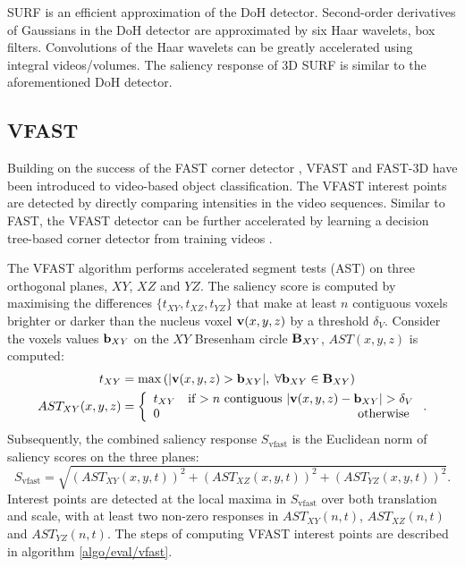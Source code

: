 SURF is an efficient approximation of the DoH detector. Second-order derivatives of Gaussians in the DoH detector are approximated by six Haar wavelets, \ie box filters. Convolutions of the Haar wavelets can be greatly accelerated using integral videos/volumes. The saliency response of 3D SURF is similar to the aforementioned DoH detector. 

\subsection{VFAST}
\label{sec/eval/vfast}

Building on the success of the FAST corner detector \cite{Rosten2010}, VFAST \cite{Yu2010} and FAST-3D \cite{Koelstra2009} have been introduced to video-based object classification. 
The VFAST interest points are detected by directly comparing intensities in the video sequences. Similar to FAST, the VFAST detector can be further accelerated by learning a decision tree-based corner detector from training videos \cite{Rosten2010}. 

The VFAST algorithm performs accelerated segment tests (AST) on three orthogonal planes, $XY$, $XZ$ and $YZ$. The saliency score is computed by maximising the differences $\{ t_{XY}, t_{XZ}, t_{YZ} \}$ that make at least $n$ contiguous voxels brighter or darker than the nucleus voxel $\mathbf{v}(x,y,z)$ by a threshold $\delta_{V}$. Consider the voxels values $\mathbf{b}_{XY}$ on the $XY$ Bresenham circle $\mathbf{B}_{XY}$, $AST(x,y,z)$ is computed:  
\begin{align}
	t_{XY} & = \max\left(| \mathbf{v}(x,y,z) > \mathbf{b}_{XY}|,\;\forall \mathbf{b}_{XY} \in \mathbf{B}_{XY} \right)\\ 
AST_{XY}(x,y,z) & = \left\{
\begin{array}{lr}
	t_{XY} & \mbox{if $> n$ contiguous } |\mathbf{v}(x,y,z) - \mathbf{b}_{XY}| > \delta_{V} \\
	0 & \mbox{ otherwise }
\end{array}
\right..
\label{eqn/eval/fastast}
\end{align}
Subsequently, the combined saliency response $S_{\textrm{vfast}}$ is the Euclidean norm of saliency scores on the three planes: 
\begin{equation}
S_\textrm{vfast} = \sqrt{ \left(AST_{XY}(x,y,t)\right)^2+ \left(AST_{XZ}(x,y,t)\right)^2+ \left(AST_{YZ}(x,y,t)\right)^2}.
\label{eqn/eval/fastverall}
\end{equation}
Interest points are detected at the local maxima in $S_{\textrm{vfast}}$ over both translation and scale, with at least two non-zero responses in $AST_{XY}(n,t)$, $AST_{XZ}(n,t)$ and $AST_{YZ}(n,t)$. The steps of computing VFAST interest points are described in algorithm \ref{algo/eval/vfast}. 


